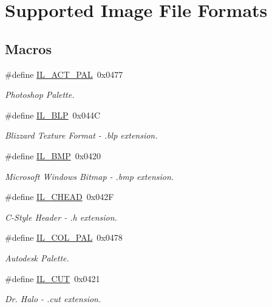 \hypertarget{group__il__formats}{\section{Supported Image File Formats}
\label{group__il__formats}
}
\subsection*{Macros}
\begin{DoxyCompactItemize}
\item 
\#define \hyperlink{group__il__formats_ga9bc802d415ba7c1823e7893559b38056}{I\+L\+\_\+\+A\+C\+T\+\_\+\+P\+A\+L}~0x0477
\begin{DoxyCompactList}\small\item\em Photoshop Palette. \end{DoxyCompactList}\item 
\#define \hyperlink{group__il__formats_ga74d0d914139910e51ffe7ff325598413}{I\+L\+\_\+\+B\+L\+P}~0x044\+C
\begin{DoxyCompactList}\small\item\em Blizzard Texture Format -\/ .blp extension. \end{DoxyCompactList}\item 
\#define \hyperlink{group__il__formats_gadd7e1d2be4e95756abb5b71a3c57cb5b}{I\+L\+\_\+\+B\+M\+P}~0x0420
\begin{DoxyCompactList}\small\item\em Microsoft Windows Bitmap -\/ .bmp extension. \end{DoxyCompactList}\item 
\#define \hyperlink{group__il__formats_ga1c3111c577bb6039cac1affd2e90309c}{I\+L\+\_\+\+C\+H\+E\+A\+D}~0x042\+F
\begin{DoxyCompactList}\small\item\em C-\/\+Style Header -\/ .h extension. \end{DoxyCompactList}\item 
\#define \hyperlink{group__il__formats_ga1ff30165267b494756246e5548aa6caa}{I\+L\+\_\+\+C\+O\+L\+\_\+\+P\+A\+L}~0x0478
\begin{DoxyCompactList}\small\item\em Autodesk Palette. \end{DoxyCompactList}\item 
\#define \hyperlink{group__il__formats_ga087328a3745acd566143064645bfc463}{I\+L\+\_\+\+C\+U\+T}~0x0421
\begin{DoxyCompactList}\small\item\em Dr. Halo -\/ .cut extension. \end{DoxyCompactList}\item 

\end{DoxyCompactItemize}
